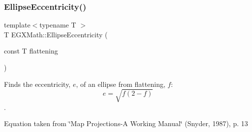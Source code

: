 \subsubsection{\texorpdfstring{Ellipse\+Eccentricity()}{EllipseEccentricity()}\hspace{0.1cm}{\footnotesize\ttfamily [1/2]}}
{\footnotesize\ttfamily template$<$typename T $>$ \\
T E\+G\+X\+Math\+::\+Ellipse\+Eccentricity (\begin{DoxyParamCaption}\item[{const T}]{flattening }\end{DoxyParamCaption})}



Finds the eccentricity, $e$, of an ellipse from flattening, $f$\+: \[ e = \sqrt{f (2 - f)} \]. 

Equation taken from \char`\"{}\+Map Projections-\/\+A Working Manual\char`\"{} (Snyder, 1987), p. 13

